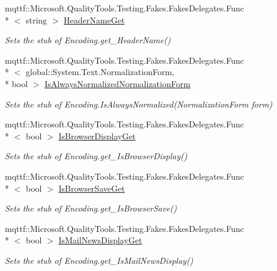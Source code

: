 \begin{DoxyCompactItemize}
mqttf\-::\-Microsoft.\-Quality\-Tools.\-Testing.\-Fakes.\-Fakes\-Delegates.\-Func\\*
$<$ string $>$ \hyperlink{class_system_1_1_text_1_1_fakes_1_1_stub_u_t_f7_encoding_aa0c1d7cd3bd90675ad8f0ad1c70c333b}{Header\-Name\-Get}
\begin{DoxyCompactList}\small\item\em Sets the stub of Encoding.\-get\-\_\-\-Header\-Name()\end{DoxyCompactList}\item 
mqttf\-::\-Microsoft.\-Quality\-Tools.\-Testing.\-Fakes.\-Fakes\-Delegates.\-Func\\*
$<$ global\-::\-System.\-Text.\-Normalization\-Form, \\*
bool $>$ \hyperlink{class_system_1_1_text_1_1_fakes_1_1_stub_u_t_f7_encoding_a341472ee0175f2c6aaa052d7dd7c1a6a}{Is\-Always\-Normalized\-Normalization\-Form}
\begin{DoxyCompactList}\small\item\em Sets the stub of Encoding.\-Is\-Always\-Normalized(\-Normalization\-Form form)\end{DoxyCompactList}\item 
mqttf\-::\-Microsoft.\-Quality\-Tools.\-Testing.\-Fakes.\-Fakes\-Delegates.\-Func\\*
$<$ bool $>$ \hyperlink{class_system_1_1_text_1_1_fakes_1_1_stub_u_t_f7_encoding_ab608bdd2a9b044431ba47aa429a01a4b}{Is\-Browser\-Display\-Get}
\begin{DoxyCompactList}\small\item\em Sets the stub of Encoding.\-get\-\_\-\-Is\-Browser\-Display()\end{DoxyCompactList}\item 
mqttf\-::\-Microsoft.\-Quality\-Tools.\-Testing.\-Fakes.\-Fakes\-Delegates.\-Func\\*
$<$ bool $>$ \hyperlink{class_system_1_1_text_1_1_fakes_1_1_stub_u_t_f7_encoding_aab9825399e1e469af090f4126b0555ee}{Is\-Browser\-Save\-Get}
\begin{DoxyCompactList}\small\item\em Sets the stub of Encoding.\-get\-\_\-\-Is\-Browser\-Save()\end{DoxyCompactList}\item 
mqttf\-::\-Microsoft.\-Quality\-Tools.\-Testing.\-Fakes.\-Fakes\-Delegates.\-Func\\*
$<$ bool $>$ \hyperlink{class_system_1_1_text_1_1_fakes_1_1_stub_u_t_f7_encoding_aeef15586bb149174513850b1ac12ac65}{Is\-Mail\-News\-Display\-Get}
\begin{DoxyCompactList}\small\item\em Sets the stub of Encoding.\-get\-\_\-\-Is\-Mail\-News\-Display()\end{DoxyCompactList}\item 

\end{DoxyCompactItemize}
